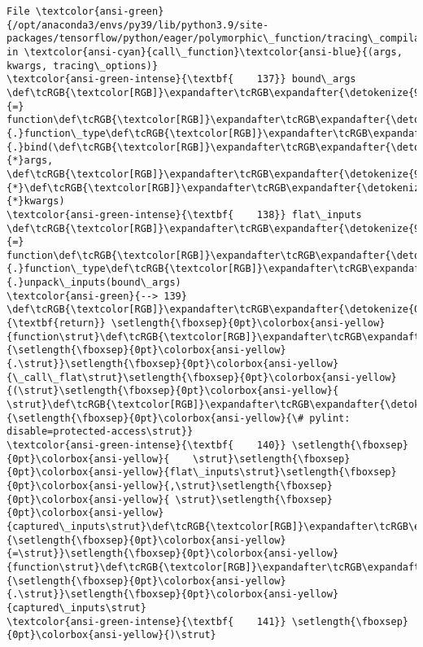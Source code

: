 \documentclass[11pt]{article}
\begin{document}
\begin{Verbatim}[commandchars=\\\{\}, frame=single, framerule=2mm, rulecolor=\color{outerrorbackground}]
File \textcolor{ansi-green}{/opt/anaconda3/envs/py39/lib/python3.9/site-packages/tensorflow/python/eager/polymorphic\_function/tracing\_compilation.py:139}, in \textcolor{ansi-cyan}{call\_function}\textcolor{ansi-blue}{(args, kwargs, tracing\_options)}
\textcolor{ansi-green-intense}{\textbf{    137}} bound\_args \def\tcRGB{\textcolor[RGB]}\expandafter\tcRGB\expandafter{\detokenize{98,98,98}}{=} function\def\tcRGB{\textcolor[RGB]}\expandafter\tcRGB\expandafter{\detokenize{98,98,98}}{.}function\_type\def\tcRGB{\textcolor[RGB]}\expandafter\tcRGB\expandafter{\detokenize{98,98,98}}{.}bind(\def\tcRGB{\textcolor[RGB]}\expandafter\tcRGB\expandafter{\detokenize{98,98,98}}{*}args, \def\tcRGB{\textcolor[RGB]}\expandafter\tcRGB\expandafter{\detokenize{98,98,98}}{*}\def\tcRGB{\textcolor[RGB]}\expandafter\tcRGB\expandafter{\detokenize{98,98,98}}{*}kwargs)
\textcolor{ansi-green-intense}{\textbf{    138}} flat\_inputs \def\tcRGB{\textcolor[RGB]}\expandafter\tcRGB\expandafter{\detokenize{98,98,98}}{=} function\def\tcRGB{\textcolor[RGB]}\expandafter\tcRGB\expandafter{\detokenize{98,98,98}}{.}function\_type\def\tcRGB{\textcolor[RGB]}\expandafter\tcRGB\expandafter{\detokenize{98,98,98}}{.}unpack\_inputs(bound\_args)
\textcolor{ansi-green}{--> 139} \def\tcRGB{\textcolor[RGB]}\expandafter\tcRGB\expandafter{\detokenize{0,135,0}}{\textbf{return}} \setlength{\fboxsep}{0pt}\colorbox{ansi-yellow}{function\strut}\def\tcRGB{\textcolor[RGB]}\expandafter\tcRGB\expandafter{\detokenize{98,98,98}}{\setlength{\fboxsep}{0pt}\colorbox{ansi-yellow}{.\strut}}\setlength{\fboxsep}{0pt}\colorbox{ansi-yellow}{\_call\_flat\strut}\setlength{\fboxsep}{0pt}\colorbox{ansi-yellow}{(\strut}\setlength{\fboxsep}{0pt}\colorbox{ansi-yellow}{  \strut}\def\tcRGB{\textcolor[RGB]}\expandafter\tcRGB\expandafter{\detokenize{95,135,135}}{\setlength{\fboxsep}{0pt}\colorbox{ansi-yellow}{\# pylint: disable=protected-access\strut}}
\textcolor{ansi-green-intense}{\textbf{    140}} \setlength{\fboxsep}{0pt}\colorbox{ansi-yellow}{    \strut}\setlength{\fboxsep}{0pt}\colorbox{ansi-yellow}{flat\_inputs\strut}\setlength{\fboxsep}{0pt}\colorbox{ansi-yellow}{,\strut}\setlength{\fboxsep}{0pt}\colorbox{ansi-yellow}{ \strut}\setlength{\fboxsep}{0pt}\colorbox{ansi-yellow}{captured\_inputs\strut}\def\tcRGB{\textcolor[RGB]}\expandafter\tcRGB\expandafter{\detokenize{98,98,98}}{\setlength{\fboxsep}{0pt}\colorbox{ansi-yellow}{=\strut}}\setlength{\fboxsep}{0pt}\colorbox{ansi-yellow}{function\strut}\def\tcRGB{\textcolor[RGB]}\expandafter\tcRGB\expandafter{\detokenize{98,98,98}}{\setlength{\fboxsep}{0pt}\colorbox{ansi-yellow}{.\strut}}\setlength{\fboxsep}{0pt}\colorbox{ansi-yellow}{captured\_inputs\strut}
\textcolor{ansi-green-intense}{\textbf{    141}} \setlength{\fboxsep}{0pt}\colorbox{ansi-yellow}{)\strut}


\end{Verbatim}
\end{document}
